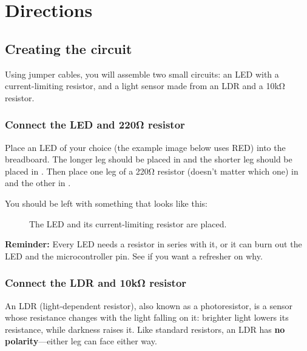 

\section{Directions}

\subsection{Creating the circuit}
Using jumper cables, you will assemble two small circuits: an LED with a current-limiting resistor,
and a light sensor made from an LDR and a 10\si{\kilo\ohm} resistor.



\subsubsection{Connect the LED and 220\si{\ohm} resistor}
Place an LED of your choice (the example image below uses RED) into the breadboard. The longer leg
should be placed in  and the shorter leg should be placed in
. Then place one leg of a 220\si{\ohm} resistor (doesn't matter which one)
in  and the other in .

You should be left with something that looks like this:
\begin{figure}[H]
    \centering
    \caption{The LED and its current-limiting resistor are placed.}
\end{figure}

\begin{tcolorbox}[colback=yellow!10!white,colframe=yellow!50!black]
    \textbf{Reminder:} Every LED needs a resistor in series with it, or it can burn out the LED and the
    microcontroller pin. See  if you want a refresher on why.
\end{tcolorbox}

\subsubsection{Connect the LDR and 10\si{\kilo\ohm} resistor}
An LDR (light-dependent resistor), also known as a photoresistor, is a sensor whose resistance
changes with the light falling on it: brighter light lowers its resistance, while darkness raises it.
Like standard resistors, an LDR has \textbf{no polarity}---either leg can face either way.

